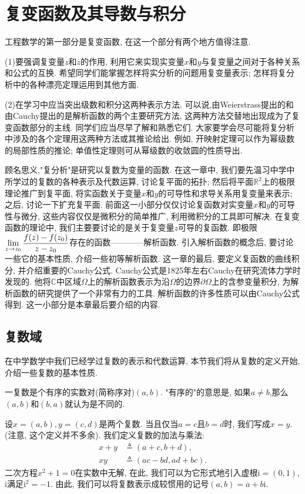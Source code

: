 \setcounter{chapter}{0}
\chapter{复变函数及其导数与积分}
	工程数学的第一部分是复变函数, 在这一个部分有两个地方值得注意. 
	
	(1)要强调复变量$z$和$\overline{z}$的作用, 利用它来实现实变量$x$和$y$与复变量之间对于各种关系和公式的互换. 希望同学们能掌握怎样将实分析的问题用复变量表示; 怎样将复分析中的各种漂亮定理运用到其他方面.
	
	(2)在学习中应当突出级数和积分这两种表示方法. 可以说,由Weierstrass提出的和由Cauchy提出的是解析函数的两个主要研究方法, 这两种方法交替地出现成为了复变函数部分的主线. 同学们应当尽早了解和熟悉它们. 大家要学会尽可能将复分析中涉及的各个定理用这两种方法或其推论给出. 例如, 开映射定理可以作为幂级数的局部性质的推论; 单值性定理则可从幂级数的收敛圆的性质导出.
	
	顾名思义,"复分析"是研究以复数为变量的函数. 在这一章中, 我们要先温习中学中所学过的复数的各种表示及代数运算, 讨论复平面的拓扑; 然后将平面$\mathbb{R}^2$上的极限理论推广到复平面, 将实函数关于变量$x$和$y$的可导性和求导关系用复变量来表示; 之后, 讨论一下扩充复平面. 前面这一小部分仅仅讨论复函数对实变量$x$和$y$的可导性与微分, 这些内容仅仅是微积分的简单推广, 利用微积分的工具即可解决. 在复变函数的理论中, 我们主要要讨论的是关于复变量$z$可导的复函数. 即极限$\begin{lgathered} \lim_{z\to z_0}\frac{f(z)-f(z_0)}{z-z_0} \end{lgathered}$存在的函数————解析函数. 引入解析函数的概念后, 要讨论一些它的基本性质, 介绍一些初等解析函数. 这一章的最后, 要定义复函数的曲线积分, 并介绍重要的Cauchy公式. Cauchy公式是1825年左右Cauchy在研究流体力学时发现的. 他将$\mathbb{C}$中区域$\Omega$上的解析函数表示为沿$\Omega$的边界$\partial\Omega$上的含参变量积分, 为解析函数的研究提供了一个非常有力的工具. 解析函数的许多性质可以由Cauchy公式得到. 这一小部分是本章最后要介绍的内容.
\section{复数域}
	在中学数学中我们已经学过复数的表示和代数运算, 本节我们将从复数的定义开始, 介绍一些复数的基本性质.
    \begin{definition}
        一复数是个有序的实数对(简称序对)$(a,b)$. "有序的"的意思是, 如果$a\neq b$,那么$(a,b)$和$(b,a)$就认为是不同的.
    \end{definition}
	设$x=(a,b),y=(c,d)$是两个复数. 当且仅当$a=c$且$b=d$时, 我们写成$x=y$.(注意, 这个定义并不多余). 我们定义复数的加法与乘法:
	\begin{align}
	    x+y&\triangleq (a+c,b+d),\\
	  xy&\triangleq (ac-bd,ad+bc).  
	\end{align}
	二次方程$x^2+1=0$在实数中无解, 在此, 我们可以为它形式地引入虚根$\mathrm{i} = (0,1)$, $\mathrm{i}$满足$\mathrm{i}^2 = -1$. 由此, 我们可以将复数表示成较惯用的记号$(a,b) = a+b\mathrm{i}$.
	

